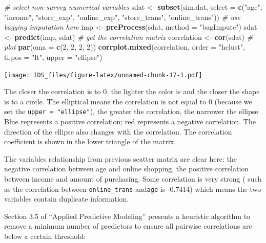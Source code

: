 \documentclass[12pt,]{krantz}
\makeatletter
\newenvironment{Shaded}{\begin{snugshade}}{\end{snugshade}}
\newcommand{\CommentTok}[1]{\textcolor[rgb]{0.37,0.37,0.37}{\textit{#1}}}
\newcommand{\DataTypeTok}[1]{\textcolor[rgb]{0.27,0.27,0.27}{#1}}
\newcommand{\DecValTok}[1]{\textcolor[rgb]{0.06,0.06,0.06}{#1}}
\newcommand{\KeywordTok}[1]{\textcolor[rgb]{0.27,0.27,0.27}{\textbf{#1}}}
\newcommand{\NormalTok}[1]{#1}
\newcommand{\StringTok}[1]{\textcolor[rgb]{0.5,0.5,0.5}{#1}}
\newenvironment{kframe}{%
\medskip{}
\setlength{\fboxsep}{.8em}
 \def\at@end@of@kframe{}%
 \ifinner\ifhmode%
  \def\at@end@of@kframe{\end{minipage}}%
  \begin{minipage}{\columnwidth}%
 \fi\fi%
 \def\FrameCommand##1{\hskip\@totalleftmargin \hskip-\fboxsep
 \colorbox{shadecolor}{##1}\hskip-\fboxsep
     \hskip-\linewidth \hskip-\@totalleftmargin \hskip\columnwidth}%
 \MakeFramed {\advance\hsize-\width
   \@totalleftmargin\z@ \linewidth\hsize
   \@setminipage}}%
 {\par\unskip\endMakeFramed%
 \at@end@of@kframe}
\renewenvironment{Shaded}{\begin{kframe}}{\end{kframe}}
\makeatother
\begin{document}
\begin{Shaded}
\begin{Highlighting}[]
\CommentTok{# select non-survey numerical variables}
\NormalTok{sdat <-}\StringTok{ }\KeywordTok{subset}\NormalTok{(sim.dat, }\DataTypeTok{select =} \KeywordTok{c}\NormalTok{(}\StringTok{"age"}\NormalTok{, }\StringTok{"income"}\NormalTok{, }\StringTok{"store_exp"}\NormalTok{, }
    \StringTok{"online_exp"}\NormalTok{, }\StringTok{"store_trans"}\NormalTok{, }\StringTok{"online_trans"}\NormalTok{))}
\CommentTok{# use bagging imputation here}
\NormalTok{imp <-}\StringTok{ }\KeywordTok{preProcess}\NormalTok{(sdat, }\DataTypeTok{method =} \StringTok{"bagImpute"}\NormalTok{)}
\NormalTok{sdat <-}\StringTok{ }\KeywordTok{predict}\NormalTok{(imp, sdat)}
\CommentTok{# get the correlation matrix}
\NormalTok{correlation <-}\StringTok{ }\KeywordTok{cor}\NormalTok{(sdat)}
\CommentTok{# plot}
\KeywordTok{par}\NormalTok{(}\DataTypeTok{oma =} \KeywordTok{c}\NormalTok{(}\DecValTok{2}\NormalTok{, }\DecValTok{2}\NormalTok{, }\DecValTok{2}\NormalTok{, }\DecValTok{2}\NormalTok{))}
\KeywordTok{corrplot.mixed}\NormalTok{(correlation, }\DataTypeTok{order =} \StringTok{"hclust"}\NormalTok{, }\DataTypeTok{tl.pos =} \StringTok{"lt"}\NormalTok{, }
    \DataTypeTok{upper =} \StringTok{"ellipse"}\NormalTok{)}
\end{Highlighting}
\end{Shaded}

\texttt{[image: IDS\_files/figure-latex/unnamed-chunk-17-1.pdf]}

The closer the correlation is to 0, the lighter the color is and the closer the shape is to a circle. The elliptical means the correlation is not equal to 0 (because we set the \texttt{upper\ =\ "ellipse"}), the greater the correlation, the narrower the ellipse. Blue represents a positive correlation; red represents a negative correlation. The direction of the ellipse also changes with the correlation. The correlation coefficient is shown in the lower triangle of the matrix.

The variables relationship from previous scatter matrix are clear here: the negative correlation between age and online shopping, the positive correlation between income and amount of purchasing. Some correlation is very strong ( such as the correlation between \texttt{online\_trans} and\texttt{age} is -0.7414) which means the two variables contain duplicate information.

Section 3.5 of ``Applied Predictive Modeling'' \citep{APM} presents a heuristic algorithm to remove a minimum number of predictors to ensure all pairwise correlations are below a certain threshold:
\end{document}

